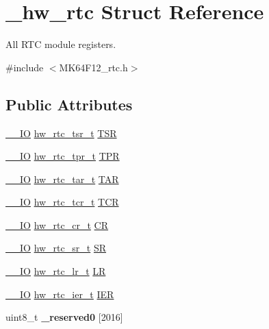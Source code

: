 \hypertarget{struct__hw__rtc}{}\section{\+\_\+hw\+\_\+rtc Struct Reference}
\label{struct__hw__rtc}


All R\+TC module registers.  




{\ttfamily \#include $<$M\+K64\+F12\+\_\+rtc.\+h$>$}

\subsection*{Public Attributes}
\begin{DoxyCompactItemize}
\item 
\hyperlink{core__sc300_8h_aec43007d9998a0a0e01faede4133d6be}{\+\_\+\+\_\+\+IO} \hyperlink{union__hw__rtc__tsr}{hw\+\_\+rtc\+\_\+tsr\+\_\+t} \hyperlink{struct__hw__rtc_a627152ef88639bb85bd0dce2369dce0c}{T\+SR}
\item 
\hyperlink{core__sc300_8h_aec43007d9998a0a0e01faede4133d6be}{\+\_\+\+\_\+\+IO} \hyperlink{union__hw__rtc__tpr}{hw\+\_\+rtc\+\_\+tpr\+\_\+t} \hyperlink{struct__hw__rtc_a88e5a08718be18d95b23a90dc8bcc88f}{T\+PR}
\item 
\hyperlink{core__sc300_8h_aec43007d9998a0a0e01faede4133d6be}{\+\_\+\+\_\+\+IO} \hyperlink{union__hw__rtc__tar}{hw\+\_\+rtc\+\_\+tar\+\_\+t} \hyperlink{struct__hw__rtc_a11dc25112e4ba76d809648d14fcb8839}{T\+AR}
\item 
\hyperlink{core__sc300_8h_aec43007d9998a0a0e01faede4133d6be}{\+\_\+\+\_\+\+IO} \hyperlink{union__hw__rtc__tcr}{hw\+\_\+rtc\+\_\+tcr\+\_\+t} \hyperlink{struct__hw__rtc_a7f6233d069c5a25e3716216d37cafaf6}{T\+CR}
\item 
\hyperlink{core__sc300_8h_aec43007d9998a0a0e01faede4133d6be}{\+\_\+\+\_\+\+IO} \hyperlink{union__hw__rtc__cr}{hw\+\_\+rtc\+\_\+cr\+\_\+t} \hyperlink{struct__hw__rtc_a04684e99db8deadb2b8acbb1fa304d95}{CR}
\item 
\hyperlink{core__sc300_8h_aec43007d9998a0a0e01faede4133d6be}{\+\_\+\+\_\+\+IO} \hyperlink{union__hw__rtc__sr}{hw\+\_\+rtc\+\_\+sr\+\_\+t} \hyperlink{struct__hw__rtc_a8f41164b6b77cd59ace74fd7195746a2}{SR}
\item 
\hyperlink{core__sc300_8h_aec43007d9998a0a0e01faede4133d6be}{\+\_\+\+\_\+\+IO} \hyperlink{union__hw__rtc__lr}{hw\+\_\+rtc\+\_\+lr\+\_\+t} \hyperlink{struct__hw__rtc_a64caa291e61f4f375eccd4d44ccceb8e}{LR}
\item 
\hyperlink{core__sc300_8h_aec43007d9998a0a0e01faede4133d6be}{\+\_\+\+\_\+\+IO} \hyperlink{union__hw__rtc__ier}{hw\+\_\+rtc\+\_\+ier\+\_\+t} \hyperlink{struct__hw__rtc_a01ec0cb43cfa1ddb91b867cc40bcf797}{I\+ER}
\item 
uint8\+\_\+t {\bfseries \+\_\+reserved0} \mbox{[}2016\mbox{]}\hypertarget{struct__hw__rtc_a71ea6659ee2bdf03cd06daec61c48da0}{}\label{struct__hw__rtc_a71ea6659ee2bdf03cd06daec61c48da0}


\end{DoxyCompactItemize}
